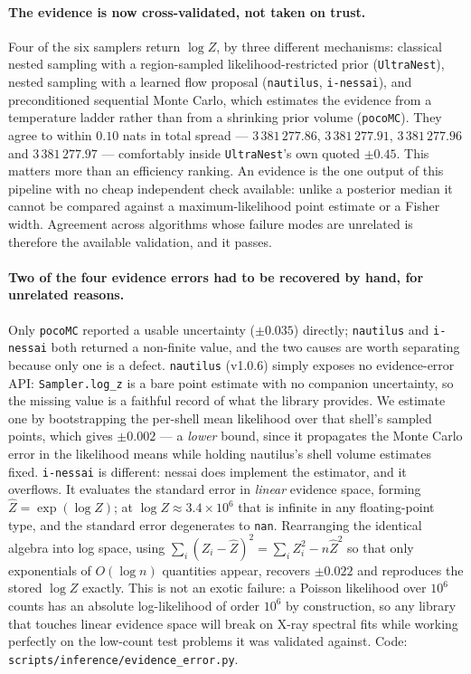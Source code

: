 \documentclass[11pt,a4paper]{article}
\newcommand{\code}[1]{\texttt{#1}}
\begin{document}
\paragraph{The evidence is now cross-validated, not taken on trust.} Four of the
six samplers return $\log Z$, by three different mechanisms: classical nested
sampling with a region-sampled likelihood-restricted prior (\code{UltraNest}),
nested sampling with a learned flow proposal (\code{nautilus}, \code{i-nessai}),
and preconditioned sequential Monte Carlo, which estimates the evidence from a
temperature ladder rather than from a shrinking prior volume (\code{pocoMC}).
They agree to within $0.10$ nats in total spread --- $3\,381\,277.86$,
$3\,381\,277.91$, $3\,381\,277.96$ and $3\,381\,277.97$ --- comfortably inside
\code{UltraNest}'s own quoted $\pm0.45$. This matters more than an efficiency
ranking. An evidence is the one output of this pipeline with no cheap
independent check available: unlike a posterior median it cannot be compared
against a maximum-likelihood point estimate or a Fisher width. Agreement across
algorithms whose failure modes are unrelated is therefore the available
validation, and it passes.

\paragraph{Two of the four evidence errors had to be recovered by hand, for
unrelated reasons.} Only \code{pocoMC} reported a usable uncertainty
($\pm0.035$) directly; \code{nautilus} and \code{i-nessai} both returned a
non-finite value, and the two causes are worth separating because only one is a
defect. \code{nautilus} (v1.0.6) simply exposes no evidence-error API:
\code{Sampler.log\_z} is a bare point estimate with no companion uncertainty, so
the missing value is a faithful record of what the library provides. We estimate
one by bootstrapping the per-shell mean likelihood over that shell's sampled
points, which gives $\pm0.002$ --- a \emph{lower} bound, since it propagates the
Monte Carlo error in the likelihood means while holding nautilus's shell volume
estimates fixed. \code{i-nessai} is different: nessai does implement the
estimator, and it overflows. It evaluates the standard error in \emph{linear}
evidence space, forming $\hat{Z}=\exp(\log Z)$; at $\log Z\approx3.4\times10^{6}$
that is infinite in any floating-point type, and the standard error degenerates
to \code{nan}. Rearranging the identical algebra into log space, using
$\sum_i(Z_i-\hat Z)^2=\sum_i Z_i^2-n\hat Z^2$ so that only exponentials of
$O(\log n)$ quantities appear, recovers $\pm0.022$ and reproduces the stored
$\log Z$ exactly. This is not an exotic failure: a Poisson likelihood over
$10^{6}$ counts has an absolute log-likelihood of order $10^{6}$ by
construction, so any library that touches linear evidence space will break on
X-ray spectral fits while working perfectly on the low-count test problems it
was validated against. Code: \code{scripts/inference/evidence\_error.py}.
\end{document}
